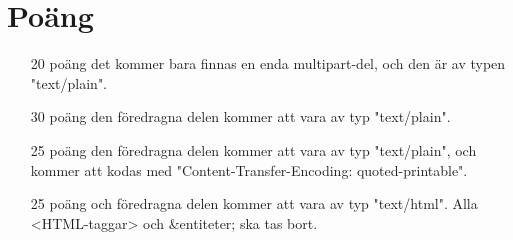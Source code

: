 \section*{Poäng}

\begin{enumerate}
	\item[20 poäng] det kommer bara finnas en enda multipart-del, och den är av typen "text/plain".
	\item[30 poäng] den föredragna delen kommer att vara av typ "text/plain".
	\item[25 poäng] den föredragna delen kommer att vara av typ "text/plain", och kommer att kodas med "Content-Transfer-Encoding: quoted-printable".
  \item[25 poäng] och föredragna delen kommer att vara av typ "text/html". Alla <HTML-taggar> och \&entiteter; ska tas bort.
\end{enumerate}
